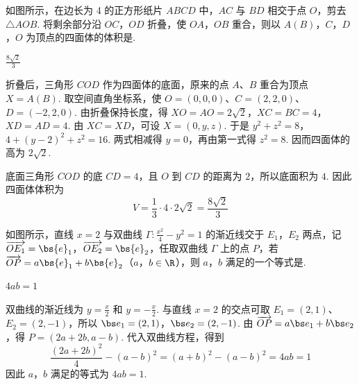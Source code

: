 \begin{problem}
如图所示，在边长为 4 的正方形纸片 \(ABCD\) 中，\(AC\) 与 \(BD\) 相交于点 \(O\)，剪去 \(\triangle AOB\). 将剩余部分沿 \(OC\)，\(OD\) 折叠，使 \(OA\)，\(OB\) 重合，则以 \(A(B)\)，\(C\)，\(D\)，\(O\) 为顶点的四面体的体积是\fillinblank{}.

\end{problem}

\begin{answer}
\(\frac{8\sqrt{2}}{3}\)
\end{answer}

\begin{solution}
折叠后，三角形 \(COD\) 作为四面体的底面，原来的点 \(A\)、\(B\) 重合为顶点 \(X=A(B)\). 取空间直角坐标系，使
\(O=(0,0,0)\)、\(C=(2,2,0)\)、\(D=(-2,2,0)\). 由折叠保持长度，得
\(XO=AO=2\sqrt2\)，\(XC=BC=4\)，\(XD=AD=4\). 由 \(XC=XD\)，可设 \(X=(0,y,z)\). 于是
\(y^2+z^2=8\)，\(4+(y-2)^2+z^2=16\).
两式相减得 \(y=0\)，再由第一式得 \(z^2=8\). 因而四面体的高为 \(2\sqrt2\).

底面三角形 \(COD\) 的底 \(CD=4\)，且 \(O\) 到 \(CD\) 的距离为 \(2\)，所以底面积为 \(4\). 因此四面体体积为
\[
V=\frac13\cdot4\cdot2\sqrt2=\frac{8\sqrt2}{3}
\]
\end{solution}

\begin{problem}
如图所示，直线 \(x = 2\) 与双曲线 \(\Gamma: \frac{x^2}{4} - y^2 = 1\) 的渐近线交于 \(E_1\)，\(E_2\) 两点，记 \(\overrightarrow{OE_1} = \bs{e}_1\)，\(\overrightarrow{OE_2} = \bs{e}_2\)，任取双曲线 \(\Gamma\) 上的点 \(P\)，若 \(\overrightarrow{OP} = a\bs{e}_1 + b\bs{e}_2\)（\(a\)，\(b \in \R\)），则 \(a\)，\(b\) 满足的一个等式是\fillinblank{}.

\end{problem}

\begin{answer}
\(4ab=1\)
\end{answer}

\begin{solution}
双曲线的渐近线为 \(y=\frac{x}{2}\) 和 \(y=-\frac{x}{2}\). 与直线 \(x=2\) 的交点可取 \(E_1=(2,1)\)、\(E_2=(2,-1)\)，所以
\(\bs e_1=(2,1)\)，\(\bs e_2=(2,-1)\).
由 \(\overrightarrow{OP}=a\bs e_1+b\bs e_2\)，得 \(P=(2a+2b,a-b)\). 代入双曲线方程，得到
\[
\frac{(2a+2b)^2}{4}-(a-b)^2=(a+b)^2-(a-b)^2=4ab=1
\]
因此 \(a\)，\(b\) 满足的等式为 \(4ab=1\).
\end{solution}

